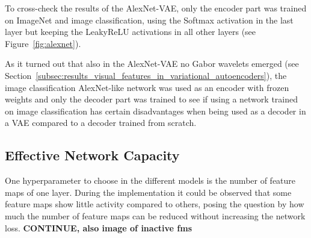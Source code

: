 To cross-check the results of the AlexNet-VAE, only the encoder part was trained on ImageNet and image classification, using the Softmax activation in the last layer but keeping the \ac{LeakyReLU} activations in all other layers (see Figure~\ref{fig:alexnet}).

As it turned out that also in the AlexNet-VAE no Gabor wavelets emerged (see Section~\ref{subsec:results_visual_features_in_variational_autoencoders}), the image classification AlexNet-like network was used as an encoder with frozen weights and only the decoder part was trained to see if using a network trained on image classification has certain disadvantages when being used as a decoder in a \ac{VAE} compared to a decoder trained from scratch.

\subsection{Effective Network Capacity}\label{subsec:effective-network-capacity}
One hyperparameter to choose in the different models is the number of feature maps of one layer.
During the implementation it could be observed that some feature maps show little activity compared to others, posing the question by how much the number of feature maps can be reduced without increasing the network loss.
\textbf{CONTINUE, also image of inactive fms}